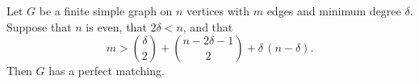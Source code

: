 \begin{theorem}
\label{SimpleGraph.perfectMatching_of_card_edges_gt}
Let $G$ be a finite simple graph on $n$ vertices with $m$ edges and minimum degree
$\delta$. Suppose that $n$ is even, that $2\delta < n$, and that
\[ m > \binom{\delta}{2} + \binom{n - 2\delta - 1}{2} + \delta\,(n - \delta). \]
Then $G$ has a perfect matching.
\end{theorem}
